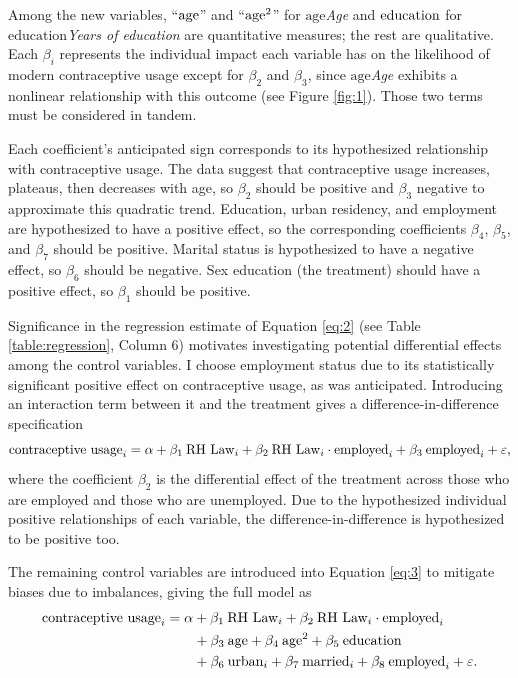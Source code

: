 \documentclass[12pt]{article}
\newcommand{\age}{%
    \ifmmode\ensuremath{\text{age}}\else\textit{Age}\fi
}
\newcommand{\educ}{%
    \ifmmode\ensuremath{\textrm{education}}\else\textit{Years of education}\fi
}
\newcommand{\urban}{%
    \ifmmode\ensuremath{\textrm{urban}_i}\else\textit{Urban resident}\fi
}
\newcommand{\married}{%
    \ifmmode\ensuremath{\textrm{married}_i}\else\textit{Married}\fi
}
\newcommand{\employed}{%
    \ifmmode\ensuremath{\textrm{employed}_i}\else\textit{Employed}\fi
}
\newcommand{\outcome}{\ensuremath{\textrm{contraceptive usage}_i}}
\newcommand{\treatment}{\ensuremath{\textrm{RH Law}_i}}
\begin{document}
    Among the new variables, ``$\age$'' and ``$\age^2$'' for \age{} and $\educ$ for \educ{} are quantitative measures; the rest are qualitative.
    Each $\beta_i$ represents the individual impact each variable has on the likelihood of modern contraceptive usage except for $\beta_2$ and $\beta_3$, since \age{} exhibits a nonlinear relationship with this outcome (see Figure \ref{fig:1}).
    Those two terms must be considered in tandem.

    Each coefficient's anticipated sign corresponds to its hypothesized relationship with contraceptive usage.
    The data suggest that contraceptive usage increases, plateaus, then decreases with age, so $\beta_2$ should be positive and $\beta_3$ negative to approximate this quadratic trend.
    Education, urban residency, and employment are hypothesized to have a positive effect, so the corresponding coefficients $\beta_4$, $\beta_5$, and $\beta_7$ should be positive.
    Marital status is hypothesized to have a negative effect, so $\beta_6$ should be negative.
    Sex education (the treatment) should have a positive effect, so $\beta_1$ should be positive.

    Significance in the regression estimate of Equation \ref{eq:2} (see Table \ref{table:regression}, Column 6) motivates investigating potential differential effects among the control variables.
    I choose employment status due to its statistically significant positive effect on contraceptive usage, as was anticipated. 
    Introducing an interaction term between it and the treatment gives a difference-in-difference specification
    \begin{equation}
        \label{eq:3}
        \outcome = \alpha + \beta_1 \: \treatment + \beta_2 \: \treatment \cdot \employed + \beta_3 \: \employed + \varepsilon,
    \end{equation}
    where the coefficient $\beta_2$ is the differential effect of the treatment across those who are employed and those who are unemployed. 
    Due to the hypothesized individual positive relationships of each variable, the difference-in-difference is hypothesized to be positive too.

    The remaining control variables are introduced into Equation \ref{eq:3} to mitigate biases due to imbalances, giving the full model as
    \begin{align}
    \begin{split}
        \label{eq:4}
        \outcome &= \alpha + \beta_1 \: \treatment + \beta_2 \: \treatment \cdot \employed \\
        &\qquad + \beta_3 \: \age + \beta_4 \: \age^2 + \beta_5 \: \educ \\
        &\qquad + \beta_6 \: \urban + \beta_7 \: \married + \beta_8 \: \employed + \varepsilon.
    \end{split}
    \end{align}
\end{document}

